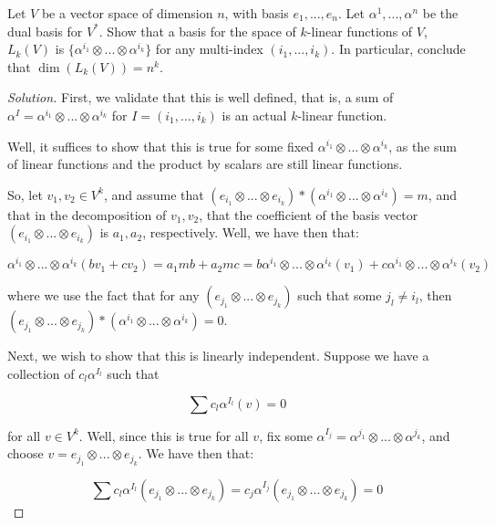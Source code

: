 \documentclass[10pt]{article}
\newenvironment{problem}[2][]{\begin{trivlist}
\item[\hskip \labelsep {\bfseries #1}\hskip \labelsep {\bfseries #2.}]}{\end{trivlist}}
\begin{document}
\begin{problem}{Question 5}

Let $V$ be a vector space of dimension $n$, with basis $e_1,...,e_n$. Let $\alpha^1,...,\alpha^n$ be the dual basis for $V^*$. Show that a basis for the space of $k$-linear functions of $V$, $L_k(V)$ is $\{ \alpha^{i_1} \otimes ... \otimes \alpha^{i_k} \}$ for any multi-index $(i_1,...,i_k)$. In particular, conclude that $\dim(L_k(V)) = n^k$.  

\end{problem}

\begin{proof}[Solution]

First, we validate that this is well defined, that is, a sum of $\alpha^I = \alpha^{i_1} \otimes ... \otimes \alpha^{i_k}$ for $I = (i_1,...,i_k)$ is an actual $k$-linear function.

Well, it suffices to show that this is true for some fixed $\alpha^{i_1} \otimes ... \otimes \alpha^{i_k}$, as the sum of linear functions and the product by scalars are still linear functions.

So, let $v_1, v_2 \in V^k$, and assume that $(e_{i_1}\otimes ... \otimes e_{i_k}) * (\alpha^{i_1} \otimes ... \otimes \alpha^{i_k}) = m$, and that in the decomposition of $v_1, v_2$, that the coefficient of the basis vector $(e_{i_1}\otimes ... \otimes e_{i_k})$ is $a_1, a_2$, respectively. Well, we have then that:

$$ \alpha^{i_1} \otimes ... \otimes \alpha^{i_k} (b v_1 + c v_2) =  a_1 m  b + a_2 m c =b  \alpha^{i_1} \otimes ... \otimes \alpha^{i_k} ( v_1) + c \alpha^{i_1} \otimes ... \otimes \alpha^{i_k} ( v_2)$$

where we use the fact that for any $ (e_{j_1}\otimes ... \otimes e_{j_k})$ such that some $j_l \neq i_l$, then $  (e_{j_1}\otimes ... \otimes e_{j_k}) *  (\alpha^{i_1} \otimes ... \otimes \alpha^{i_k}) = 0$.

Next, we wish to show that this is linearly independent. Suppose we have a collection of $c_l \alpha^{I_l}$ such that

$$ \sum c_l \alpha^{I_l}(v) = 0$$

for all $ v \in V^k$. Well, since this is true for all $v$, fix some $\alpha^{I_j} =   \alpha^{j_1} \otimes ... \otimes \alpha^{j_k}$, and choose $v = e_{j_1} \otimes ... \otimes e_{j_k}$. We have then that:

$$ \sum c_l \alpha^{I_l}(e_{j_1} \otimes ... \otimes e_{j_k}) = c_j \alpha^{I_j} (e_{j_1} \otimes ... \otimes e_{j_k}) = 0$$


\end{proof}
\end{document}
